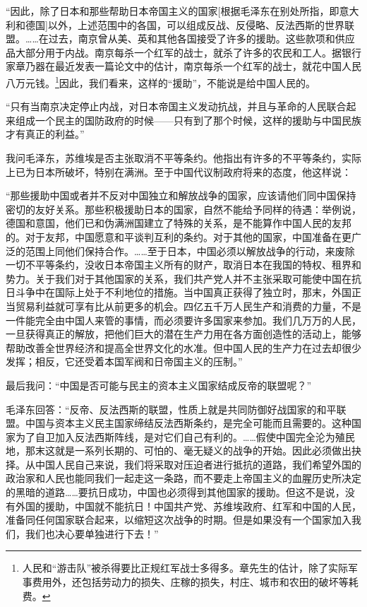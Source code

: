 \documentclass[10pt]{book}
\begin{document}
“因此，除了日本和那些帮助日本帝国主义的国家[根据毛泽东在别处所指，即意大利和德国]以外，上述范围中的各国，可以组成反战、反侵略、反法西斯的世界联盟。……在过去，南京曾从美、英和其他各国接受了许多的援助。这些款项和供应品大部分用于内战。南京每杀一个红军的战士，就杀了许多的农民和工人。据银行家章乃器在最近发表一篇论文中的估计，南京每杀一个红军的战士，就花中国人民八万元钱。\footnote{人民和“游击队”被杀得要比正规红军战士多得多。章先生的估计，除了实际军事费用外，还包括劳动力的损失、庄稼的损失，村庄、城市和农田的破坏等耗费。}因此，我们看来，这样的“援助”，不能说是给中国人民的。

“只有当南京决定停止内战，对日本帝国主义发动抗战，并且与革命的人民联合起来组成一个民主的国防政府的时候——只有到了那个时候，这样的援助与中国民族才有真正的利益。”

我问毛泽东，苏维埃是否主张取消不平等条约。他指出有许多的不平等条约，实际上已为日本所破坏，特别在满洲。至于中国代议制政府将来的态度，他这样说：

“那些援助中国或者并不反对中国独立和解放战争的国家，应该请他们同中国保持密切的友好关系。那些积极援助日本的国家，自然不能给予同样的待遇：举例说，德国和意国，他们已和伪满洲国建立了特殊的关系，是不能算作中国人民的友邦的。对于友邦，中国愿意和平谈判互利的条约。对于其他的国家，中国准备在更广泛的范围上同他们保持合作。……至于日本，中国必须以解放战争的行动，来废除一切不平等条约，没收日本帝国主义所有的财产，取消日本在我国的特权、租界和势力。关于我们对于其他国家的关系，我们共产党人并不主张采取可能使中国在抗日斗争中在国际上处于不利地位的措施。当中国真正获得了独立时，那末，外国正当贸易利益就可享有比从前更多的机会。四亿五千万人民生产和消费的力量，不是一件能完全由中国人来管的事情，而必须要许多国家来参加。我们几万万的人民，一旦获得真正的解放，把他们巨大的潜在生产力用在各方面创造性的活动上，能够帮助改善全世界经济和提高全世界文化的水准。但中国人民的生产力在过去却很少发挥；相反，它还受着本国军阀和日帝国主义的压制。”

最后我问：“中国是否可能与民主的资本主义国家结成反帝的联盟呢？”

毛泽东回答：“反帝、反法西斯的联盟，性质上就是共同防御好战国家的和平联盟。中国与资本主义民主国家缔结反法西斯条约，是完全可能而且需要的。这种国家为了自卫加入反法西斯阵线，是对它们自己有利的。……假使中国完全沦为殖民地，那末这就是一系列长期的、可怕的、毫无疑义的战争的开始。因此必须做出抉择。从中国人民自己来说，我们将采取对压迫者进行抵抗的道路，我们希望外国的政治家和人民也能同我们一起走这一条路，而不要走上帝国主义的血腥历史所决定的黑暗的道路……要抗日成功，中国也必须得到其他国家的援助。但这不是说，没有外国的援助，中国就不能抗日！中国共产党、苏维埃政府、红军和中国的人民，准备同任何国家联合起来，以缩短这次战争的时期。但是如果没有一个国家加入我们，我们也决心要单独进行下去！”
\end{document}
